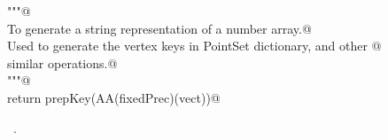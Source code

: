 \documentclass[11pt,oneside]{article}	%
\begin{document}
\begin{flushleft}
\begin{list}{}{}
\mbox{}\verb@   """@\\
\mbox{}\verb@   To generate a string representation of a number array.@\\
\mbox{}\verb@   Used to generate the vertex keys in PointSet dictionary, and other @\\
\mbox{}\verb@   similar operations.@\\
\mbox{}\verb@   """@\\
\mbox{}\verb@   return prepKey(AA(fixedPrec)(vect))@\\
\mbox{}\verb@@{\NWsep}
\end{list}
\vspace{-1ex}
\footnotesize\addtolength{\baselineskip}{-1ex}
\begin{list}{}{\setlength{\itemsep}{-\parsep}\setlength{\itemindent}{-\leftmargin}}
\item \NWtxtMacroRefIn\ .
\end{list}
\end{flushleft}




\end{document}
